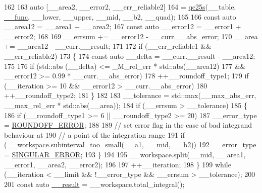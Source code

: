 \begin{DoxyCode}
162 
163           \textcolor{keyword}{auto} [\_\_area2, \_\_error2, \_\_err\_reliable2]
164             = \hyperlink{namespace____gnu__cxx_a5659189e193b420e201b6769d65289b9}{qc25s}(\_\_table, \hyperlink{namespace____gnu__cxx_af2b2f0c7a2ae72b922b1afefae5a65b2}{\_\_func}, \_\_lower, \_\_upper, \_\_mid, \_\_b2, \_\_quad);
165 
166           \textcolor{keyword}{const} \textcolor{keyword}{auto} \_\_area12 = \_\_area1 + \_\_area2;
167           \textcolor{keyword}{const} \textcolor{keyword}{auto} \_\_error12 = \_\_error1 + \_\_error2;
168 
169           \_\_errsum += \_\_error12 - \_\_curr.\_\_abs\_error;
170           \_\_area += \_\_area12 - \_\_curr.\_\_result;
171 
172           \textcolor{keywordflow}{if} (\_\_err\_reliable1 && \_\_err\_reliable2)
173             \{
174               \textcolor{keyword}{const} \textcolor{keyword}{auto} \_\_delta = \_\_curr.\_\_result - \_\_area12;
175 
176               \textcolor{keywordflow}{if} (std::abs (\_\_delta) <= \_M\_rel\_err * std::abs(\_\_area12)
177                  && \_\_error12 >= 0.99 * \_\_curr.\_\_abs\_error)
178                 ++\_\_roundoff\_type1;
179               \textcolor{keywordflow}{if} (\_\_iteration >= 10 && \_\_error12 > \_\_curr.\_\_abs\_error)
180                 ++\_\_roundoff\_type2;
181             \}
182 
183           \_\_tolerance = std::max(\_\_max\_abs\_err, \_\_max\_rel\_err * std::abs(\_\_area));
184           \textcolor{keywordflow}{if} (\_\_errsum > \_\_tolerance)
185             \{
186               \textcolor{keywordflow}{if} (\_\_roundoff\_type1 >= 6 || \_\_roundoff\_type2 >= 20)
187                 \_\_error\_type = \hyperlink{namespace____gnu__cxx_ad6c62dd86a596716cece6ac2d4cfd4b3a29574de87143c7715e9a138d7340e8ae}{ROUNDOFF\_ERROR};
188 
189               \textcolor{comment}{// set error flag in the case of bad integrand behaviour at}
190               \textcolor{comment}{// a point of the integration range}
191               \textcolor{keywordflow}{if} (\_\_workspace.subinterval\_too\_small(\_\_a1, \_\_mid, \_\_b2))
192                 \_\_error\_type = \hyperlink{namespace____gnu__cxx_ad6c62dd86a596716cece6ac2d4cfd4b3a8e955ea89d59c116d92f16f345620d04}{SINGULAR\_ERROR};
193             \}
194 
195           \_\_workspace.split(\_\_mid, \_\_area1, \_\_error1, \_\_area2, \_\_error2);
196 
197           ++\_\_iteration;
198         \}
199       \textcolor{keywordflow}{while} (\_\_iteration < \_\_limit && !\_\_error\_type && \_\_errsum > \_\_tolerance);
200 
201       \textcolor{keyword}{const} \textcolor{keyword}{auto} \hyperlink{namespace____gnu__cxx_a500ea9f53aeaecd8c2ae657503450578}{\_\_result} = \_\_workspace.total\_integral();

\end{DoxyCode}
